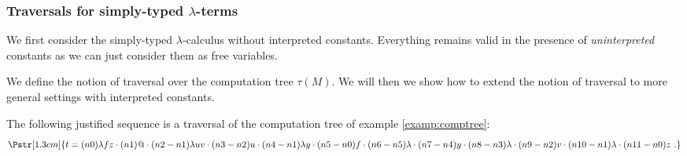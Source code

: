 \subsubsection{Traversals for simply-typed \texorpdfstring{$\lambda$}{lambda}-terms}

We first consider the simply-typed $\lambda$-calculus without interpreted constants.
Everything remains valid in the presence of \emph{uninterpreted} constants as we can just
consider them as free variables.

We define the notion of traversal over the computation tree $\tau(M)$.
We will then we show how to extend the notion of traversal to more general settings with interpreted constants.




\begin{example}
\label{examp:trav} The following justified sequence is a traversal
of the computation tree of example \ref{examp:comptree}:
$$\Pstr[1.3cm]{ t= (n0){\lambda f z}
        \cdot (n1){@}
        \cdot (n2-n1){\lambda u v}
        \cdot (n3-n2){u}
        \cdot (n4-n1){\lambda y}
        \cdot (n5-n0){f}
        \cdot (n6-n5){\lambda }
        \cdot (n7-n4){y}
        \cdot (n8-n3){\lambda }
        \cdot (n9-n2){v}
        \cdot (n10-n1){\lambda }
        \cdot (n11-n0){z} \ .
}$$
\end{example}


